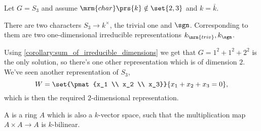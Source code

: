 \documentclass[10pt,a4paper,twoside,openany,hidelinks]{book}
\begin{document}
\begin{example}
Let $G = S_3$ and assume $\mrm{char}\prs{k} \notin \set{2,3}$ and $k = \bar{k}$.

There are two characters $S_3 \to k^\times$, the trivial one and $\sgn$.
Corresponding to them are two one-dimensional irreducible representations $k_{\mrm{triv}}, k_{\sgn}$.

Using \ref{corollary:sum_of_irreducible_dimensions} we get that
$G = 1^2 + 1^2 + 2^2$
is the only solution, so there's one other representation which is of dimension $2$.
We've seen another representation of $S_3$,
\[W = \set{\pmat{x_1 \\ x_2 \\ x_3}}{x_1 + x_2 + x_3 = 0} \text{,}\]
which is then the required $2$-dimensional representation.
\end{example}


\begin{definition}[$k$-Algebra]
A  is a ring $A$ which is also a $k$-vector space, such that the multiplication map $A \times A \to A$ is $k$-bilinear.
\end{definition}

\begin{comment}
\begin{thebibliography}{2}
\bibitem{context} 
Emily Riehl. 
\textit{Category Theory in Context}. 

\bibitem{nlab}
\textit{nLab - Online Wiki with Focus on Category Theory and Homotopy Theory}.\\
\href{https://ncatlab.org/nlab/show/HomePage}{https://ncatlab.org/nlab/show/HomePage}
\end{thebibliography}
\end{comment}

\backmatter
\end{document}
